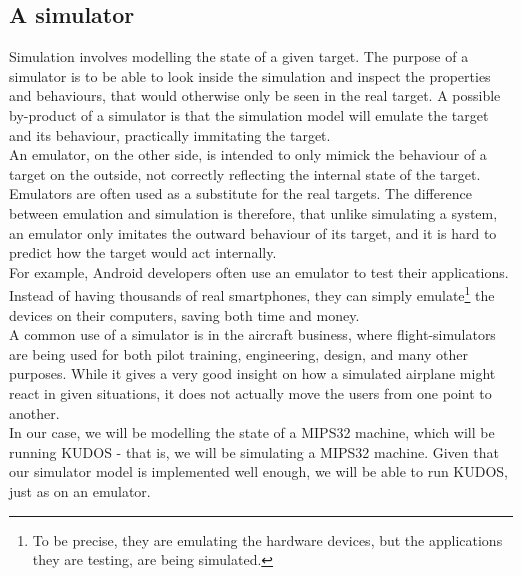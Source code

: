 \subsection{A simulator}
Simulation involves modelling the state of a given target.  The purpose of a
simulator is to be able to look inside the simulation and inspect the properties
and behaviours, that would otherwise only be seen in the real target.
A possible by-product of a simulator is that the simulation model will emulate
the target and its behaviour, practically immitating the target.\\
An emulator, on the other side, is intended to only mimick the behaviour of
a target on the outside, not correctly reflecting the internal state of the target.
Emulators are often used as a substitute for the real targets.
The difference between emulation and simulation is therefore, that unlike simulating a system,
an emulator only imitates the outward behaviour of its target, and it is hard
to predict how the target would act internally.\\
For example, Android developers often use an emulator to test their applications.
Instead of having thousands of real smartphones, they can simply emulate\footnote{
To be precise, they are emulating the hardware devices, but the applications they
are testing, are being simulated.}
the devices on their computers, saving both time and money.\\
A common use of a simulator is in the aircraft business, where flight-simulators
are being used for both pilot training, engineering, design, and many other
purposes. While it gives a very good insight on how a simulated airplane might
react in given situations, it does not actually move the users from one point
to another.\\
In our case, we will be modelling the state of a MIPS32 machine, which will be
running KUDOS - that is, we will be simulating a MIPS32 machine. Given that our
simulator model is implemented well enough, we will be able to run KUDOS, just as
on an emulator.\\


